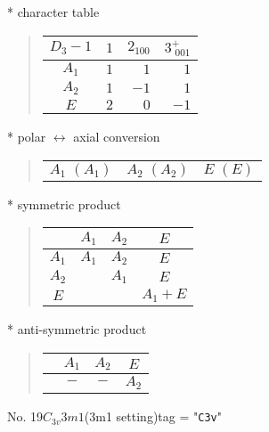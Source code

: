 \documentclass[fleqn,10pt,landscape]{jsarticle}
\begin{document}
* character table
\begin{quote}
\begin{tabular}{crrr} \hline \hline
$ D_{3}-1 $ & $ 1 $ & $ 2{}_{100} $ & $ 3^{+}_{\,\,001} $ \\ \hline
$ A_{1} $ & $ 1 $ & $ 1 $ & $ 1 $ \\
$ A_{2} $ & $ 1 $ & $ -1 $ & $ 1 $ \\
$ E $ & $ 2 $ & $ 0 $ & $ -1 $ \\
 \hline \hline
\end{tabular}
\end{quote}
* polar $\leftrightarrow$ axial conversion
\begin{quote}
\begin{tabular}{ccc}
$ A_{1}\,\,(A_{1}) $ & $ A_{2}\,\,(A_{2}) $ & $ E\,\,(E) $
\end{tabular}
\end{quote}
* symmetric product
\begin{quote}
\begin{tabular}{c|ccc} \hline \hline
 & $ A_{1} $ & $ A_{2} $ & $ E $ \\ \hline
$ A_{1} $ & $ A_{1} $ & $ A_{2} $ & $ E $ \\
$ A_{2} $ & $  $ & $ A_{1} $ & $ E $ \\
$ E $ & $  $ & $  $ & $ A_{1} + E $ \\
 \hline \hline
\end{tabular}
\end{quote}
* anti-symmetric product
\begin{quote}
\begin{tabular}{cccc} \hline \hline
 & $ A_{1} $ & $ A_{2} $ & $ E $ \\ \hline
$  $ & $ - $ & $ - $ & $ A_{2} $ \\
 \hline \hline
\end{tabular}
\end{quote}
\newpage
No. 19\quad$C_{3v}$\quad$3m1$\quad(3m1 setting)\quad[ trigonal ]
tag = "{\tt C3v}"
\end{document}
